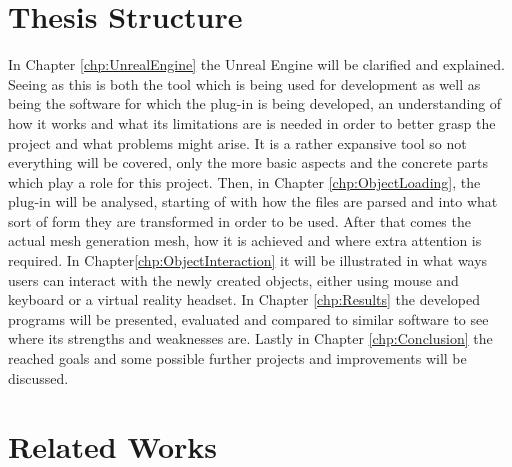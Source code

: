 \section{Thesis Structure}
In Chapter \ref{chp:UnrealEngine} the Unreal Engine will be clarified and explained. Seeing as this is both the tool which is being used for development as well as being the software for which the plug-in is being developed, an understanding of how it works and what its limitations are is needed in order to better grasp the project and what problems might arise. It is a rather expansive tool so not everything will be covered, only the more basic aspects and the concrete parts which play a role for this project. Then, in Chapter \ref{chp:ObjectLoading}, the plug-in will be analysed, starting of with how the files are parsed and into what sort of form they are transformed in order to be used. After that comes the actual mesh generation mesh, how it is achieved and where  extra attention is required. In Chapter\ref{chp:ObjectInteraction} it will be illustrated in what ways users can interact with the newly created objects, either using mouse and keyboard or a virtual reality headset. In Chapter \ref{chp:Results} the developed programs will be presented, evaluated and compared to similar software to see where its strengths and weaknesses are. Lastly in Chapter \ref{chp:Conclusion} the reached goals and some possible further projects and improvements will be discussed.


\section{Related Works}
 
